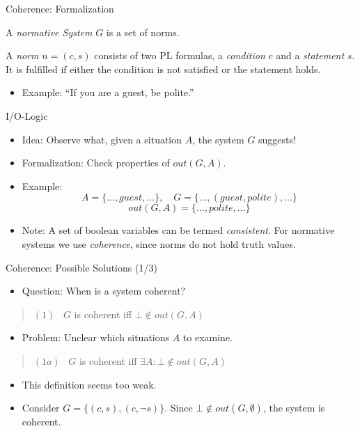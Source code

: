 \documentclass[]{beamer}
\begin{document}
\begin{frame}{Coherence: Formalization}
    \begin{definition}
        A \emph{normative System} $G$ is a set of norms.
    \end{definition}
    \begin{definition}[Norm]
        A \emph{norm} $n = (c,s)$ consists of two PL formulas, a \emph{condition} $c$ and a \emph{statement} $s$. It is fulfilled if either the condition is not satisfied or the statement holds.
    \end{definition}
    \pause
    \begin{itemize}
        \item Example: \enquote{If you are a guest, be polite.}
    \end{itemize}
\end{frame}

\begin{frame}{I/O-Logic}
    \begin{itemize}
        \item Idea: Observe what, given a situation $A$, the system $G$ suggests!
        \item Formalization: Check properties of $\mathit{out}(G,A)$.
        \pause
        \item Example:
        \[A = \{..., \mathit{guest},...\},\quad G = \{...,(\mathit{guest},\mathit{polite}),...\}\]
        \[\mathit{out}(G,A) = \{...,\mathit{polite},...\}\]
        \vspace*{-\baselineskip}\pause
        \item \small Note: A set of boolean variables can be termed \emph{consistent}. For normative systems we use \emph{coherence}, since norms do not hold truth values.
    \end{itemize}
\end{frame}

\begin{frame}{Coherence: Possible Solutions (1/3)}
    \begin{itemize}
        \item Question: When is a system coherent?
    \end{itemize}
    \pause
    \begin{quote}
        $(1)$ \ $G$ is coherent \quad iff \quad $\bot \not\in \mathit{out}(G,A)$
    \end{quote}
    \pause
    \begin{itemize}
        \item Problem: Unclear which situations $A$ to examine.
    \end{itemize}
    \pause
    \begin{quote}
        $(1a)$ \ $G$ is coherent \quad iff \quad $\exists A\colon \bot \not\in \mathit{out}(G,A)$
    \end{quote}
    \pause
    \begin{itemize}
        \item This definition seems too weak.
        \item Consider $G=\{(c,s),(c,\neg s)\}$. Since $\bot \not\in \mathit{out}(G,\emptyset)$, the system is coherent.
    \end{itemize}
\end{frame}
\end{document}
